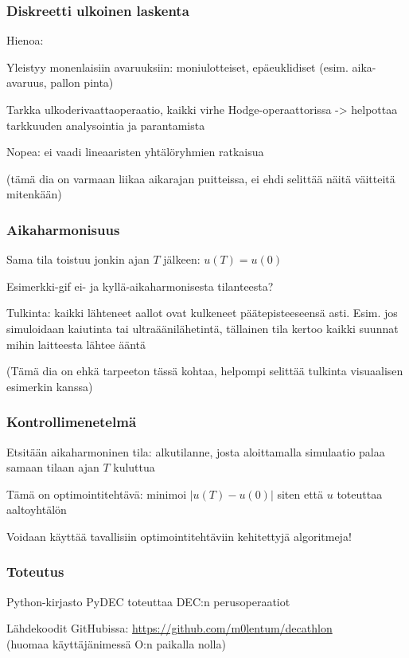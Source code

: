 \documentclass{beamer}
\begin{document}
\begin{frame}
  \frametitle{Diskreetti ulkoinen laskenta}
  Hienoa:

  Yleistyy monenlaisiin avaruuksiin:
  moniulotteiset, epäeuklidiset
  (esim. aika-avaruus, pallon pinta)

  Tarkka ulkoderivaattaoperaatio, kaikki virhe Hodge-operaattorissa
  -> helpottaa tarkkuuden analysointia ja parantamista

  Nopea: ei vaadi lineaaristen yhtälöryhmien ratkaisua

  (tämä dia on varmaan liikaa aikarajan puitteissa,
  ei ehdi selittää näitä väitteitä mitenkään)
\end{frame}

\begin{frame}
  \frametitle{Aikaharmonisuus}

  Sama tila toistuu jonkin ajan $T$ jälkeen: $u(T) = u(0)$

  Esimerkki-gif ei- ja kyllä-aikaharmonisesta tilanteesta?

  Tulkinta: kaikki lähteneet aallot ovat kulkeneet päätepisteeseensä asti.
  Esim. jos simuloidaan kaiutinta tai ultraäänilähetintä,
  tällainen tila kertoo kaikki suunnat mihin laitteesta lähtee ääntä

  (Tämä dia on ehkä tarpeeton tässä kohtaa,
  helpompi selittää tulkinta visuaalisen esimerkin kanssa)
\end{frame}

\begin{frame}
  \frametitle{Kontrollimenetelmä}

  Etsitään aikaharmoninen tila: alkutilanne, josta aloittamalla
  simulaatio palaa samaan tilaan ajan $T$ kuluttua

  \pause

  Tämä on optimointitehtävä: minimoi $|u(T) - u(0)|$
  siten että $u$ toteuttaa aaltoyhtälön

  Voidaan käyttää tavallisiin optimointitehtäviin kehitettyjä algoritmeja!
\end{frame}

\begin{frame}
  \frametitle{Toteutus}

  Python-kirjasto PyDEC toteuttaa DEC:n perusoperaatiot

  Lähdekoodit GitHubissa: \url{https://github.com/m0lentum/decathlon} \\
  (huomaa käyttäjänimessä O:n paikalla nolla)
\end{frame}
\end{document}
